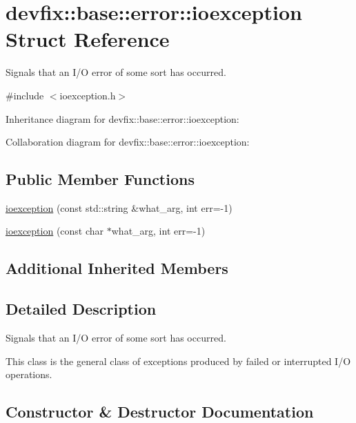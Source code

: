 \hypertarget{structdevfix_1_1base_1_1error_1_1ioexception}{}\section{devfix\+:\+:base\+:\+:error\+:\+:ioexception Struct Reference}
\label{structdevfix_1_1base_1_1error_1_1ioexception}


Signals that an I/O error of some sort has occurred.  




{\ttfamily \#include $<$ioexception.\+h$>$}



Inheritance diagram for devfix\+:\+:base\+:\+:error\+:\+:ioexception\+:


Collaboration diagram for devfix\+:\+:base\+:\+:error\+:\+:ioexception\+:
\subsection*{Public Member Functions}
\begin{DoxyCompactItemize}
\item 
\hyperlink{structdevfix_1_1base_1_1error_1_1ioexception_acaf6aa89dc63021cbf6241b897c570da}{ioexception} (const std\+::string \&what\+\_\+arg, int err=-\/1)
\item 
\hyperlink{structdevfix_1_1base_1_1error_1_1ioexception_a93e7dfc50605b9f6a9c5cd78dac59a44}{ioexception} (const char $\ast$what\+\_\+arg, int err=-\/1)
\end{DoxyCompactItemize}
\subsection*{Additional Inherited Members}


\subsection{Detailed Description}
Signals that an I/O error of some sort has occurred. 

This class is the general class of exceptions produced by failed or interrupted I/O operations. 

\subsection{Constructor \& Destructor Documentation}
\mbox{\label{structdevfix_1_1base_1_1error_1_1ioexception_acaf6aa89dc63021cbf6241b897c570da}} 
